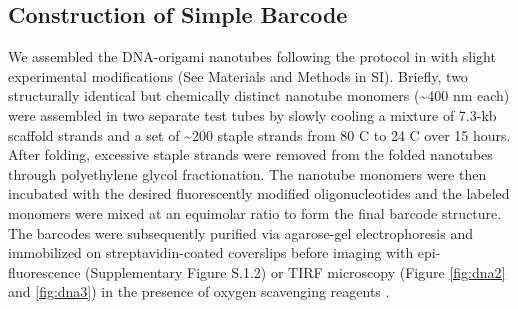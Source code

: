 \subsection{Construction of Simple Barcode}
We assembled the DNA-origami nanotubes following the protocol in \citep{douglas_dna-nanotube-induced_2007} with slight experimental modifications (See Materials and Methods in SI). 
Briefly, two structurally identical but chemically distinct nanotube monomers (\textasciitilde400 nm 
each) were assembled in two separate test tubes by slowly cooling a mixture of 7.3-kb 
scaffold strands and a set of \textasciitilde200 staple strands from 80 \textdegree C to 24 \textdegree C over 15 hours. After 
folding, excessive staple strands were removed from the folded nanotubes through 
polyethylene glycol fractionation. The nanotube monomers were then incubated with the 
desired fluorescently modified oligonucleotides and the labeled monomers were mixed at 
an equimolar ratio to form the final barcode structure. The barcodes were subsequently 
purified via agarose-gel electrophoresis and immobilized on streptavidin-coated 
coverslips before imaging with epi-fluorescence (Supplementary Figure S.1.2) or TIRF microscopy (Figure 
\ref{fig:dna2} and \ref{fig:dna3}) in the presence of oxygen scavenging reagents \citep{liedl_self-assembly_2010}. 

